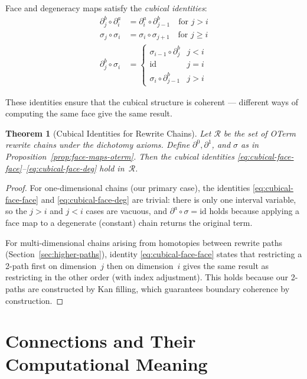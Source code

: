 \documentclass[11pt,a4paper]{report}
\theoremstyle{definition}
\theoremstyle{plain}
\newtheorem{theorem}[definition]{Theorem}
\begin{document}
Face and degeneracy maps satisfy the \emph{cubical identities}:
\begin{align}
  \partial_j^b \circ \partial_i^a &= \partial_i^a \circ \partial_{j-1}^b
    \quad \text{for $j > i$} \label{eq:cubical-face-face} \\
  \sigma_j \circ \sigma_i &= \sigma_i \circ \sigma_{j+1}
    \quad \text{for $j \geq i$} \label{eq:cubical-deg-deg} \\
  \partial_j^b \circ \sigma_i &= \begin{cases}
    \sigma_{i-1} \circ \partial_j^b & j < i \\
    \mathrm{id} & j = i \\
    \sigma_i \circ \partial_{j-1}^b & j > i
  \end{cases} \label{eq:cubical-face-deg}
\end{align}

These identities ensure that the cubical structure is coherent ---
different ways of computing the same face give the same result.

\begin{theorem}[Cubical Identities for Rewrite Chains]
\label{thm:cubical-ids-rewrite}
Let $\mathcal{R}$ be the set of OTerm rewrite chains under the
dichotomy axioms.  Define $\partial^0, \partial^1$, and $\sigma$ as
in Proposition~\ref{prop:face-maps-oterm}.  Then the cubical identities
\eqref{eq:cubical-face-face}--\eqref{eq:cubical-face-deg} hold
in~$\mathcal{R}$.
\end{theorem}

\begin{proof}
For one-dimensional chains (our primary case), the identities
\eqref{eq:cubical-face-face} and \eqref{eq:cubical-face-deg} are
trivial: there is only one interval variable, so the $j > i$ and
$j < i$ cases are vacuous, and $\partial^a \circ \sigma = \mathrm{id}$
holds because applying a face map to a degenerate (constant) chain
returns the original term.

For multi-dimensional chains arising from homotopies between rewrite
paths (Section~\ref{sec:higher-paths}), identity
\eqref{eq:cubical-face-face} states that restricting a 2-path first on
dimension~$j$ then on dimension~$i$ gives the same result as
restricting in the other order (with index adjustment).  This holds
because our 2-paths are constructed by Kan filling, which guarantees
boundary coherence by construction.
\end{proof}

\section{Connections and Their Computational Meaning}
\label{sec:connections}
\end{document}
